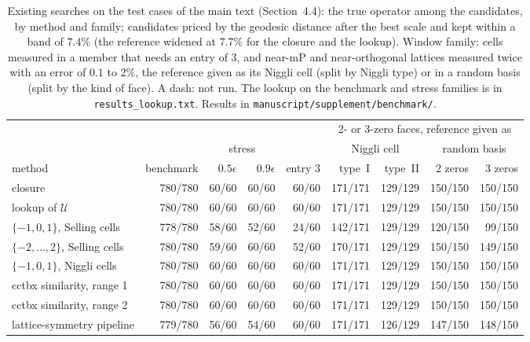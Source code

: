 \documentclass[preprint,pdf]{iucr}          %
\begin{document}
\begin{table}
\caption{Existing searches on the test cases of the main text (Section~4.4): the true operator among the candidates, by method and family; candidates priced by the geodesic distance after the best scale and kept within a band of $7.4\%$ (the reference widened at $7.7\%$ for the closure and the lookup). Window family: cells measured in a member that needs an entry of $3$, and near-mP and near-orthogonal lattices measured twice with an error of $0.1$ to $2\%$, the reference given as its Niggli cell (split by Niggli type) or in a random basis (split by the kind of face). A dash: not run. The lookup on the benchmark and stress families is in \texttt{results\_lookup.txt}. Results in \texttt{manuscript/\allowbreak supplement/\allowbreak benchmark/}.}
\label{tab:searches}
\begin{footnotesize}
\setlength{\tabcolsep}{3pt}\begin{tabular}{lrrrrrrrr}
\toprule
 & & & & & \multicolumn{4}{c}{2- or 3-zero faces, reference given as} \\
 & & \multicolumn{2}{c}{stress} & & \multicolumn{2}{c}{Niggli cell} & \multicolumn{2}{c}{random basis} \\
method & benchmark & $0.5\epsilon$ & $0.9\epsilon$ & entry $3$ & type~I & type~II & 2 zeros & 3 zeros \\
\midrule
closure & 780/780 & 60/60 & 60/60 & 60/60 & 171/171 & 129/129 & 150/150 & 150/150 \\
lookup of $\mathcal U$ & 780/780 & 60/60 & 60/60 & 60/60 & 171/171 & 129/129 & 150/150 & 150/150 \\
$\{-1,0,1\}$, Selling cells & 778/780 & 58/60 & 52/60 & 24/60 & 142/171 & 129/129 & 120/150 & 99/150 \\
$\{-2,\dots,2\}$, Selling cells & 780/780 & 59/60 & 60/60 & 52/60 & 170/171 & 129/129 & 150/150 & 149/150 \\
$\{-1,0,1\}$, Niggli cells & 780/780 & 60/60 & 60/60 & 60/60 & 171/171 & 129/129 & 150/150 & 150/150 \\
cctbx similarity, range 1 & 780/780 & 60/60 & 60/60 & 60/60 & 171/171 & 129/129 & 150/150 & 150/150 \\
cctbx similarity, range 2 & 780/780 & 60/60 & 60/60 & 60/60 & 171/171 & 129/129 & 150/150 & 150/150 \\
lattice-symmetry pipeline & 779/780 & 56/60 & 54/60 & 60/60 & 171/171 & 126/129 & 147/150 & 148/150 \\
\bottomrule
\end{tabular}
\end{footnotesize}
\end{table}
\end{document}
